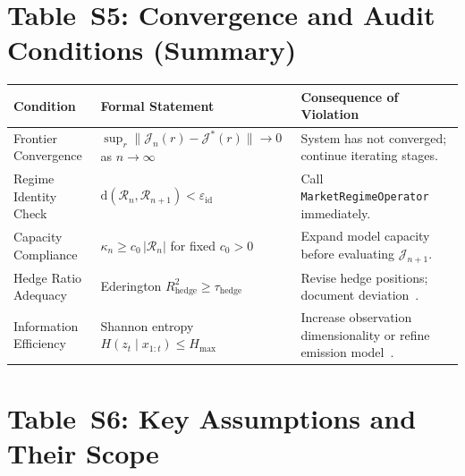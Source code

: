 \documentclass[12pt,openany]{book}
\numberwithin{equation}{chapter}
\theoremstyle{plain}
\theoremstyle{definition}
\theoremstyle{remark}
\numberwithin{equation}{chapter}
\theoremstyle{plain}
\begin{document}
\section*{Table~S5: Convergence and Audit Conditions (Summary)}

\begin{center}
\begin{tabularx}{\textwidth}{@{} l X X @{}}
\hline
\textbf{Condition} & \textbf{Formal Statement} & \textbf{Consequence of Violation} \\
\hline
Frontier Convergence &
  $\sup_{r}\|\mathcal{J}_n(r) - \mathcal{J}^*(r)\| \to 0$ as $n\to\infty$ &
  System has not converged; continue iterating stages. \\
\addlinespace
Regime Identity Check &
  $\mathrm{d}(\mathcal{R}_n, \mathcal{R}_{n+1}) < \varepsilon_{\mathrm{id}}$ &
  Call \texttt{MarketRegimeOperator} immediately. \\
\addlinespace
Capacity Compliance &
  $\kappa_n \ge c_0\,|\mathcal{R}_n|$ for fixed $c_0 > 0$ &
  Expand model capacity before evaluating $\mathcal{J}_{n+1}$. \\
\addlinespace
Hedge Ratio Adequacy &
  Ederington $R^2_{\text{hedge}} \ge \tau_{\text{hedge}}$ &
  Revise hedge positions; document deviation~\cite{R7}. \\
\addlinespace
Information Efficiency &
  Shannon entropy $H(z_t\mid x_{1:t}) \le H_{\max}$ &
  Increase observation dimensionality or refine emission model~\cite{R9}. \\
\hline
\end{tabularx}
\end{center}

\section*{Table~S6: Key Assumptions and Their Scope}
\end{document}
